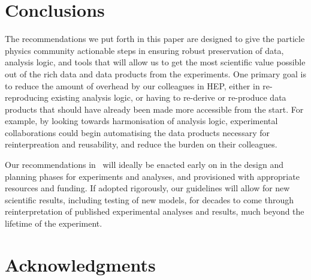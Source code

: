 \documentclass[11pt]{article}
\begin{document}
\section{Conclusions}

The recommendations we put forth in this paper are designed to give the particle physics community actionable steps in ensuring robust preservation of data, analysis logic, and tools that will allow us to get the most scientific value possible out of the rich data and data products from the experiments.
One primary goal is to reduce the amount of overhead by our colleagues in \gls{HEP}, either in re-reproducing existing analysis logic, or having to re-derive or re-produce data products that should have already been made more accessible from the start.
For example, by looking towards harmonisation of analysis logic, experimental collaborations could begin automatising the data products necessary for reinterpreation and reusability, and reduce the burden on their colleagues.

Our recommendations in~ will %
ideally be enacted early on in 
the design and planning phases for experiments and analyses, and provisioned with appropriate resources and funding. 
If adopted rigorously, our guidelines will allow for new scientific results, including testing of new models, for decades to come through reinterpretation %
of published experimental analyses and results, much beyond the lifetime of the experiment.

\section*{Acknowledgments}
\end{document}
